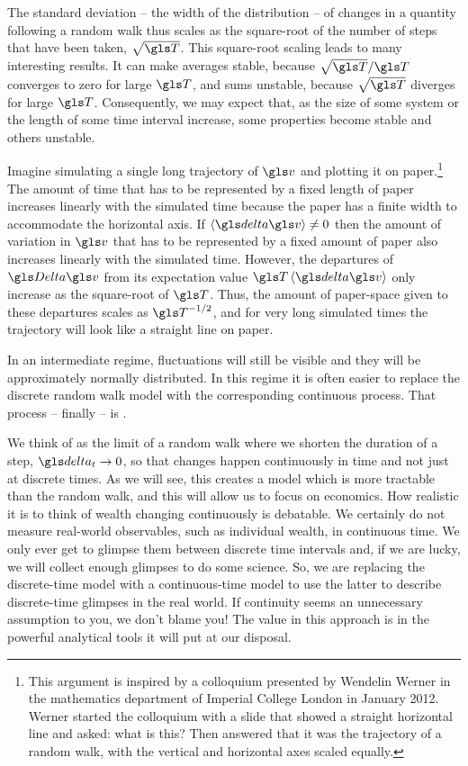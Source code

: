 The standard deviation -- the width of the distribution -- of changes in a quantity following a random walk thus scales as the square-root of the number of steps that have been taken, $\sqrt{\T}$. This square-root scaling leads to many interesting results. It can make averages stable, because $\sqrt{\T}/\T$ converges to zero for large $\T$, and sums unstable, because $\sqrt{\T}$ diverges for large $\T$. Consequently, we may expect that, as the size of some system or the length of some time interval increase, some properties become stable and others unstable.

Imagine simulating a single long trajectory of $\gv$ and plotting it on paper.\footnote{This argument is inspired by a colloquium presented by Wendelin Werner in the mathematics department of Imperial College London in January 2012. Werner started the colloquium with a slide that showed a straight horizontal line and asked: what is this? Then answered that it was the trajectory of a random walk, with the vertical and horizontal axes scaled equally.} The amount of time that has to be represented by a fixed length of paper increases linearly with the simulated time because the paper has a finite width to accommodate the horizontal axis. If $\ave{\d \gv} \neq 0$ then the amount of variation in $\gv$ that has to be represented by a fixed amount of paper also increases linearly with the simulated time. However, the departures of $\D\gv$ from its expectation value $\T \ave{\d \gv}$ only increase as the square-root of $\T$. Thus, the amount of paper-space given to these departures scales as $\T^{-1/2}$, and for very long simulated times the trajectory will look like a straight line on paper.

In an intermediate regime, fluctuations will still be visible and they will be approximately normally distributed. In this regime it is often easier to replace the discrete random walk model with the corresponding continuous process. That process -- finally -- is \BM. 

We think of \BM as the limit of a random walk where we shorten the duration of a step, $\dt \to 0$, so that changes happen continuously in time and not just at discrete times. As we will see, this creates a model which is more tractable than the random walk, and this will allow us to focus on economics. How realistic it is to think of wealth changing continuously is debatable. We certainly do not measure real-world observables, such as individual wealth, in continuous time. We only ever get to glimpse them between discrete time intervals and, if we are lucky, we will collect enough glimpses to do some science. So, we are replacing the discrete-time model with a continuous-time model to use the latter to describe discrete-time glimpses in the real world. If continuity seems an unnecessary assumption to you, we don't blame you! The value in this approach is in the powerful analytical tools it will put at our disposal.

